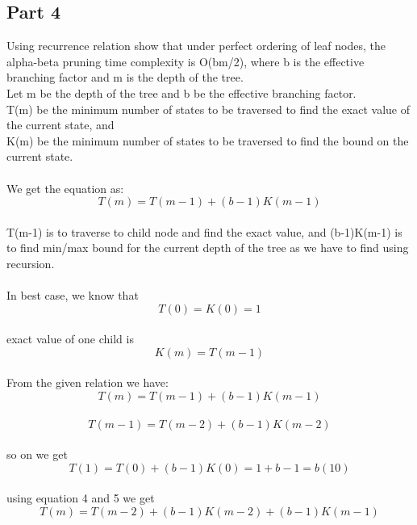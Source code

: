 \documentclass[conference]{IEEEtran}
\begin{document}
\subsection{Part 4}
Using recurrence relation show that under perfect ordering of leaf nodes, the alpha-beta pruning time complexity is O(bm/2), where b is the effective branching factor and m is the depth of the tree.
\\
Let m be the depth of the tree and b be the effective
branching factor.
\\
T(m) be the minimum number of states to be traversed to
find the exact value of the current state, and
\\
K(m) be the minimum number of states to be traversed to
find the bound on the current state.
\\
\\
We get the equation as:
\begin{equation}
T(m)=T(m-1)+(b-1)K(m-1)\label{eq}
\end{equation}
\\
T(m-1) is to traverse to child node and find the
exact value, and (b-1)K(m-1) is to find min/max bound for
the current depth of the tree as we have to find using recursion.
\\
\\
In best case, we know that
\\
\begin{equation}
T(0) = K(0) = 1\label{eq}
\end{equation}
\\
exact value of one child is
\begin{equation}
K(m)=T(m−1)\label{eq}
\end{equation}
\\
From the given relation we have:
\\
\begin{equation}
T(m) = T(m−1) + (b−1)K(m−1)\label{eq}
\end{equation}
\\
\begin{equation}
T(m−1) = T(m-2) + (b−1)K(m−2)\label{eq}
\end{equation}
\\
so on we get 
\\
\begin{equation}
T(1) = T(0) + (b-1)K(0) = 1 + b-1 = b(10)\label{eq}
\end{equation}
\\
using equation 4 and 5 we get
\\
\begin{equation}
T(m) = T(m−2)+(b−1)K(m−2)+(b−1)K(m−1) \label{eq}
\end{equation}
\end{document}

